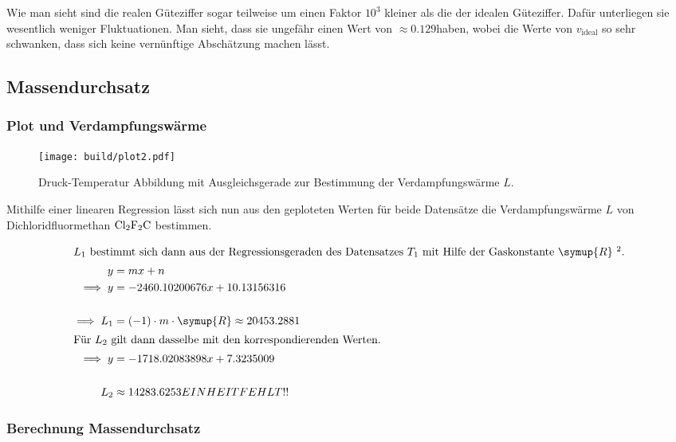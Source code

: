 Wie man sieht sind die realen Güteziffer sogar teilweise um einen Faktor $10^3$ kleiner als die der idealen Güteziffer.
Dafür unterliegen sie wesentlich weniger Fluktuationen. Man sieht, dass sie ungefähr einen Wert von $\approx 0.129$haben, 
wobei die Werte von $v_\text{ideal}$ so sehr schwanken, dass sich keine vernünftige Abschätzung machen lässt.
\newpage
\subsection{Massendurchsatz}
\subsubsection{Plot und Verdampfungswärme}

\begin{figure}
    \centering
    \texttt{[image: build/plot2.pdf]}
    \caption{Druck-Temperatur Abbildung mit Ausgleichsgerade zur Bestimmung der Verdampfungswärme $L$.}
\end{figure}

Mithilfe einer linearen Regression lässt sich nun aus den geploteten Werten für beide Datensätze 
die Verdampfungswärme $L$ von Dichloridfluormethan $\ce{Cl2F2C}$ bestimmen.

\begin{align*}
\intertext{$L_1$ bestimmt sich dann aus der Regressionsgeraden des Datensatzes $T_1$
 mit Hilfe der Gaskonstante $\symup{R}$ \footnotemark[2].}
y&=mx+n  \\
\implies y&=-2460.10200676x+10.13156316\\
\\
\implies L_1&=(-1) \cdot m \cdot \symup{R} \approx 20453.2881\\
\intertext{Für $L_2$ gilt dann dasselbe mit den korrespondierenden Werten.}
\implies y&=-1718.02083898x+7.3235009\\
\\
L_2&\approx14283.6253 EINHEITFEHLT!!
\end{align*}



\subsubsection{Berechnung Massendurchsatz}

